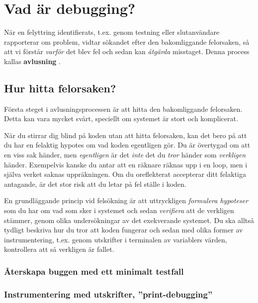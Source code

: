 \section{Vad är debugging?}

När en felyttring identifierats, t.ex. genom testning eller slutanvändare rapporterar om problem, vidtar sökandet efter den bakomliggande felorsaken, så att vi förstår \emph{varför} det blev fel och sedan kan \emph{åtgärda} misstaget. Denna process kallas \textbf{avlusning} .




\subsection{Hur hitta felorsaken?}

Första steget i avlusningsprocessen är att hitta den bakomliggande felorsaken. Detta kan vara mycket svårt, speciellt om systemet är stort och komplicerat.

När du stirrar dig blind på koden utan att hitta felorsaken, kan det bero på att du har en felaktig hypotes om vad koden egentligen gör. Du är övertygad om att en viss sak händer, men \emph{egentligen} är det \emph{inte} det du \emph{tror} händer som \emph{verkligen} händer. Exempelvis kanske du antar att en räknare räknas upp i en loop, men i själva verket saknas uppräkningen. Om du oreflekterat accepterar ditt felaktiga antagande, är det stor risk att du letar på fel ställe i koden.

En grundläggande princip vid felsökning är att uttryckligen \emph{formulera hypoteser} som du har om vad som sker i systemet och sedan \emph{verifiera} att de verkligen stämmer, genom olika undersökningar av det exekverande systemet. Du ska alltså tydligt beskriva hur du tror att koden fungerar och sedan med olika former av instrumentering, t.ex. genom utskrifter i terminalen av variablers värden, kontrollera att så verkligen är fallet.

\subsubsection{Återskapa buggen med ett minimalt testfall}

\TODO

\subsubsection{Instrumentering med utskrifter, ''print-debugging''}

